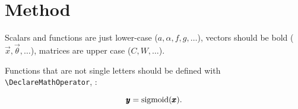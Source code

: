 \section{Method}
\label{sec:method}



Scalars and functions are just lower-case ($a, \alpha, f, g, \ldots$), vectors
should be bold ($\vec{x}, \vec{\theta}, \ldots$), matrices are upper case ($C,
W, \ldots$).

Functions that are not single letters should be defined with
\verb#\DeclareMathOperator#, \eg:

\begin{equation}
  \pmb{y}=\operatorname{sigmoid}(\pmb{x})
  \text{.}
\end{equation}
